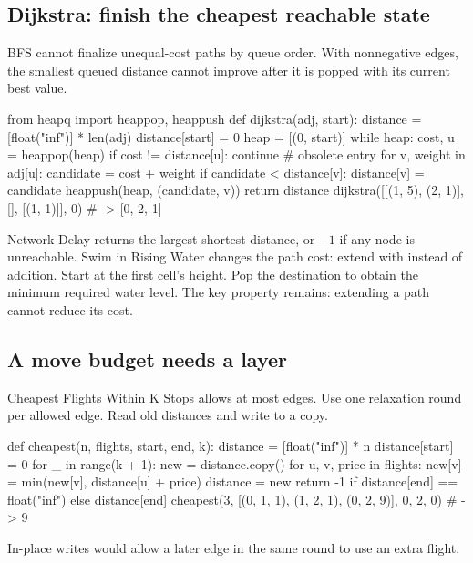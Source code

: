 \documentclass[11pt]{article}
\newcommand{\cd}[1]{{\frenchspacing\texttt{\detokenize{#1}}}}
\begin{document}
\subsection{Dijkstra: finish the cheapest reachable state}
BFS cannot finalize unequal-cost paths by queue order.
With nonnegative edges, the smallest queued distance cannot improve after it is popped with its current best value.
\par\noindent\begin{minipage}{\linewidth}
\hypertarget{example-start-44}{}
\begin{pyex}
from heapq import heappop, heappush
def dijkstra(adj, start):
    distance = [float("inf")] * len(adj)
    distance[start] = 0
    heap = [(0, start)]
    while heap:
        cost, u = heappop(heap)
        if cost != distance[u]:
            continue                 # obsolete entry
        for v, weight in adj[u]:
            candidate = cost + weight
            if candidate < distance[v]:
                distance[v] = candidate
                heappush(heap, (candidate, v))
    return distance
dijkstra([[(1, 5), (2, 1)], [], [(1, 1)]], 0) # -> [0, 2, 1]
\end{pyex}
\hypertarget{example-end-44}{}
\end{minipage}\par
Network Delay returns the largest shortest distance, or \(-1\) if any node is unreachable.
Swim in Rising Water changes the path cost: extend with \cd{max(cost, neighbor_height)} instead of addition.
Start at the first cell's height. Pop the destination to obtain the minimum required water level.
The key property remains: extending a path cannot reduce its cost.

\subsection{A move budget needs a layer}
Cheapest Flights Within K Stops allows at most \cd{k + 1} edges.
Use one relaxation round per allowed edge. Read old distances and write to a copy.
\par\noindent\begin{minipage}{\linewidth}
\hypertarget{example-start-45}{}
\begin{pyex}
def cheapest(n, flights, start, end, k):
    distance = [float("inf")] * n
    distance[start] = 0
    for _ in range(k + 1):
        new = distance.copy()
        for u, v, price in flights:
            new[v] = min(new[v], distance[u] + price)
        distance = new
    return -1 if distance[end] == float("inf") else distance[end]
cheapest(3, [(0, 1, 1), (1, 2, 1), (0, 2, 9)], 0, 2, 0) # -> 9
\end{pyex}
\hypertarget{example-end-45}{}
\end{minipage}\par
In-place writes would allow a later edge in the same round to use an extra flight.
\end{document}
